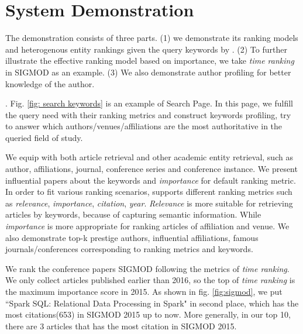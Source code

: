 \section{System Demonstration}
\par The demonstration consists of three parts. (1) we demonstrate its ranking models and heterogenous entity rankings given the query keywords by \oursystem. (2) To further illustrate the effective ranking model based on importance, we take {\em time ranking} in SIGMOD as an example. (3) We also demonstrate author profiling for better knowledge of the author.


. Fig. \ref{fig: search keywords} is an example of Search Page. In this page, we fulfill the query need with their ranking metrics and construct keywords profiling, try to answer which authors/venues/affiliations are the most authoritative in the queried field of study.

\par
We equip \oursystem with both article retrieval and other academic entity retrieval, such as author, affiliations, journal, conference series and conference instance. We present influential papers about the keywords and {\em importance} for default ranking metric. In order to fit various ranking scenarios, \oursystem supports different ranking metrics such as {\em relevance}, {\em importance}, {\em citation}, {\em year}. {\em Relevance} is more suitable for retrieving articles by keywords, because of capturing semantic information. While {\em importance} is more appropriate for ranking articles of affiliation and venue. We also demonstrate top-k prestige authors, influential affiliations, famous journals/conferences corresponding to ranking metrics and keywords.


 We rank the conference papers \eg SIGMOD following the metrics of {\em time ranking}. We only collect articles published earlier than 2016, so the top of {\em time ranking} is the maximum importance score in 2015. As shown in fig. \ref{fig:sigmod}, we put ``Spark SQL: Relational Data Processing in Spark" in second place, which has the most citations(653) in SIGMOD 2015 up to now. More generally, in our top 10, there are 3 articles that has the most citation in SIGMOD 2015.

